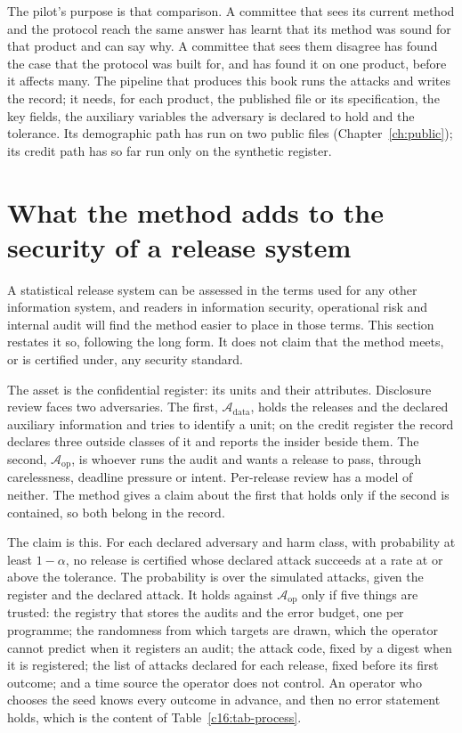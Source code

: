 The pilot's purpose is that comparison. A committee that sees its current method and
the protocol reach the same answer has learnt that its method was sound for that
product and can say why. A committee that sees them disagree has found the case that
the protocol was built for, and has found it on one product, before it affects
many. The pipeline that produces this book runs the attacks and writes the record; it
needs, for each product, the published file or its specification, the key fields, the
auxiliary variables the adversary is declared to hold and the tolerance. Its
demographic path has run on two public files (Chapter~\ref{ch:public}); its credit
path has so far run only on the synthetic register.

\section{What the method adds to the security of a release system}

A statistical release system can be assessed in the terms used for any other
information system, and readers in information security, operational risk and
internal audit will find the method easier to place in those terms. This section
restates it so, following the long form. It does not claim that the method meets, or
is certified under, any security standard.

The asset is the confidential register: its units and their attributes. Disclosure
review faces two adversaries. The first, $\mathcal{A}_{\mathrm{data}}$, holds the
releases and the declared auxiliary information and tries to identify a unit; on the
credit register the record declares three outside classes of it and reports the
insider beside them. The second, $\mathcal{A}_{\mathrm{op}}$, is whoever runs the
audit and wants a release to pass, through carelessness, deadline pressure or
intent. Per-release review has a model of neither. The method gives a claim about the
first that holds only if the second is contained, so both belong in the record.

The claim is this. For each declared adversary and harm class, with probability at
least $1 - \alpha$, no release is certified whose declared attack succeeds at a rate
at or above the tolerance. The probability is over the simulated attacks, given the
register and the declared attack. It holds against $\mathcal{A}_{\mathrm{op}}$ only if
five things are trusted: the registry that stores the audits and the error budget,
one per programme; the randomness from which targets are drawn, which the operator
cannot predict when it registers an audit; the attack code, fixed by a digest when it
is registered; the list of attacks declared for each release, fixed before its first
outcome; and a time source the operator does not control. An operator who chooses the
seed knows every outcome in advance, and then no error statement holds, which is the
content of Table~\ref{c16:tab-process}.

